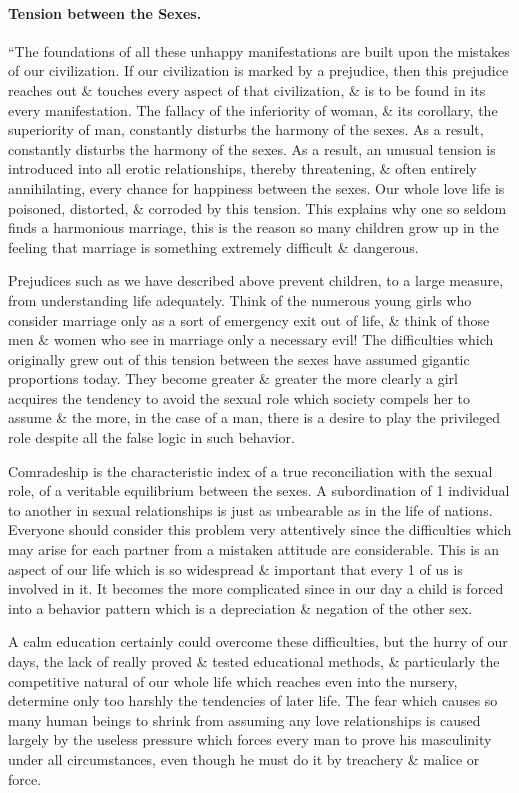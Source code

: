 \documentclass{article}
\begin{document}
\paragraph{Tension between the Sexes.} ``The foundations of all these unhappy manifestations are built upon the mistakes of our civilization. If our civilization is marked by a prejudice, then this prejudice reaches out \& touches every aspect of that civilization, \& is to be found in its every manifestation. The fallacy of the inferiority of woman, \& its corollary, the superiority of man, constantly disturbs the harmony of the sexes. As a result, constantly disturbs the harmony of the sexes. As a result, an unusual tension is introduced into all erotic relationships, thereby threatening, \& often entirely annihilating, every chance for happiness between the sexes. Our whole love life is poisoned, distorted, \& corroded by this tension. This explains why one so seldom finds a harmonious marriage, this is the reason so many children grow up in the feeling that marriage is something extremely difficult \& dangerous.

Prejudices such as we have described above prevent children, to a large measure, from understanding life adequately. Think of the numerous young girls who consider marriage only as a sort of emergency exit out of life, \& think of those men \& women who see in marriage only a necessary evil! The difficulties which originally grew out of this tension between the sexes have assumed gigantic proportions today. They become greater \& greater the more clearly a girl acquires the tendency to avoid the sexual role which society compels her to assume \& the more, in the case of a man, there is a desire to play the privileged role despite all the false logic in such behavior.

Comradeship is the characteristic index of a true reconciliation with the sexual role, of a veritable equilibrium between the sexes. A subordination of 1 individual to another in sexual relationships is just as unbearable as in the life of nations. Everyone should consider this problem very attentively since the difficulties which may arise for each partner from a mistaken attitude are considerable. This is an aspect of our life which is so widespread \& important that every 1 of us is involved in it. It becomes the more complicated since in our day a child is forced into a behavior pattern which is a depreciation \& negation of the other sex.

A calm education certainly could overcome these difficulties, but the hurry of our days, the lack of really proved \& tested educational methods, \& particularly the competitive natural of our whole life which reaches even into the nursery, determine only too harshly the tendencies of later life. The fear which causes so many human beings to shrink from assuming any love relationships is caused largely by the useless pressure which forces every man to prove his masculinity under all circumstances, even though he must do it by treachery \& malice or force.
\end{document}
